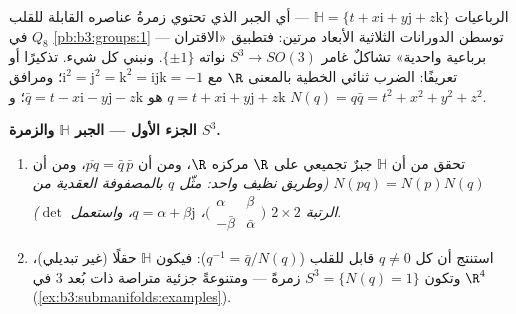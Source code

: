\begin{problem}\label{pb:b3:submanifolds:1}
الرباعيات $\mathbb H = \{t + x\mathrm i + y\mathrm j +
z\mathrm k\}$ --- أي الجبر الذي تحتوي زمرةُ عناصره القابلة
للقلب $Q_8$ في \cref{pb:b3:groups:1} --- توسطن الدورانات الثلاثية الأبعاد
مرتين: فتطبيق «الاقتران برباعية واحدية» تشاكلٌ غامر $S^3 \to
SO(3)$
نواته $\{\pm1\}$. ونبني كل شيء. تذكيرًا أو تعريفًا: الضرب ثنائي
الخطية بالمعنى $\R$ مع $\mathrm i^2 = \mathrm j^2 = \mathrm k^2 =
\mathrm{ijk} = -1$؛ ومرافق $q = t + x\mathrm i +
y\mathrm j + z\mathrm k$ هو $\bar q = t - x\mathrm i -
y\mathrm j - z\mathrm k$؛
و $N(q) = q\bar q = t^2 + x^2 + y^2
+ z^2$.

\medskip
\noindent\textbf{الجزء الأول --- الجبر $\mathbb H$ والزمرة
$S^3$.}
\begin{enumerate}
  \item تحقق من أن $\mathbb H$ جبرٌ تجميعي على $\R$ مركزه
        $\R$، ومن أن $\overline{pq} =
        \bar q\,\bar p$، ومن أن $N(pq) = N(p)N(q)$ \emph{(وطريق نظيف
        واحد: مثّل $q$ بالمصفوفة العقدية من الرتبة $2\times2$
        $\bigl(\begin{smallmatrix}\alpha & \beta\\
        -\bar\beta & \bar\alpha\end{smallmatrix}\bigr)$، $q =
        \alpha + \beta\mathrm j$، واستعمل $\det$)}.
  \item استنتج أن كل $q \neq 0$ قابل للقلب ($q^{-1} =
        \bar q/N(q)$): فيكون
        $\mathbb H$ حقلًا (غير تبديلي)، وتكون $S^3 = \{N(q) = 1\}$ زمرةً ---
        ومتنوعةً جزئية متراصة ذات بُعد $3$ في $\R^4$
        (\cref{ex:b3:submanifolds:examples}).
\end{enumerate}


\end{problem}
